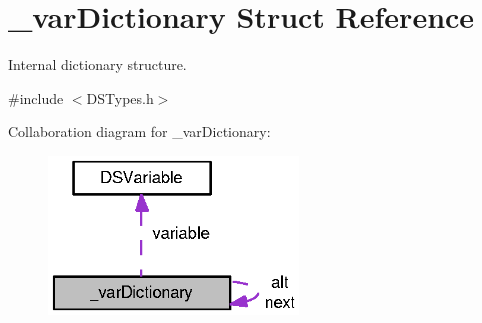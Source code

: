 \hypertarget{struct__var_dictionary}{
\section{\_\-varDictionary Struct Reference}
\label{struct__var_dictionary}
}


Internal dictionary structure.  




{\ttfamily \#include $<$DSTypes.h$>$}



Collaboration diagram for \_\-varDictionary:\nopagebreak
\begin{figure}[H]
\begin{center}
\leavevmode
\includegraphics[width=188pt]{struct__var_dictionary__coll__graph}
\end{center}
\end{figure}

